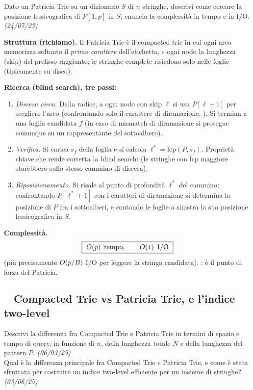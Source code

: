 \begin{domanda}
Dato un Patricia Trie su un dizionario $S$ di $n$ stringhe, descrivi come cercare la posizione
lessicografica di $P[1,p]$ in $S$; enuncia la complessit\`a in tempo e in I/O. \emph{(24/07/23)}
\end{domanda}

\textbf{Struttura (richiamo).} Il Patricia Trie \`e il compacted trie in cui ogni arco memorizza
soltanto il \emph{primo carattere} dell'etichetta, e ogni nodo la lunghezza (skip) del prefisso
raggiunto; le stringhe complete risiedono solo nelle foglie (tipicamente su disco).

\textbf{Ricerca (blind search), tre passi:}
\begin{enumerate}[leftmargin=1.8em,itemsep=1pt]
\item \emph{Discesa cieca.} Dalla radice, a ogni nodo con skip $\ell$ si usa $P[\ell+1]$ per
scegliere l'arco (confrontando solo il carattere di diramazione, ). Si termina a una foglia candidata $f$ (in caso di mismatch di diramazione si prosegue
comunque su un rappresentante del sottoalbero).
\item \emph{Verifica.} Si carica  $s_f$ della foglia e si calcola
$\ell^{*}=\mathrm{lcp}(P,s_f)$. Propriet\`a chiave che rende corretta la blind search:
 (le stringhe con lcp maggiore
starebbero sullo stesso cammino di discesa).
\item \emph{Riposizionamento.} Si risale al punto di profondit\`a $\ell^{*}$ del cammino;
confrontando $P[\ell^{*}+1]$ con i caratteri di diramazione si determina la posizione di $P$ fra i
sottoalberi, e contando le foglie a sinistra la sua posizione lessicografica in $S$.
\end{enumerate}

\textbf{Complessit\`a.}
\[
\boxed{\ \OO{p}\ \text{tempo},\qquad \OO{1}\ \text{I/O}\ }
\]
(pi\`u precisamente $O\!\left(p/B\right)$ I/O per leggere la stringa candidata). : \`e il punto di forza del Patricia.

\subsection*{-- Compacted Trie vs Patricia Trie, e l'indice two-level}

\begin{domanda}
 Descrivi la differenza fra Compacted Trie e Patricia Trie in termini di spazio e tempo
di query, in funzione di $n$, della lunghezza totale $N$ e della lunghezza del pattern $P$.
\emph{(06/03/25)}\\
 Qual \`e la differenza principale fra Compacted Trie e Patricia Trie, e come \`e stata
sfruttata per costruire un indice two-level efficiente per un insieme di stringhe?
\emph{(03/06/25)}
\end{domanda}

